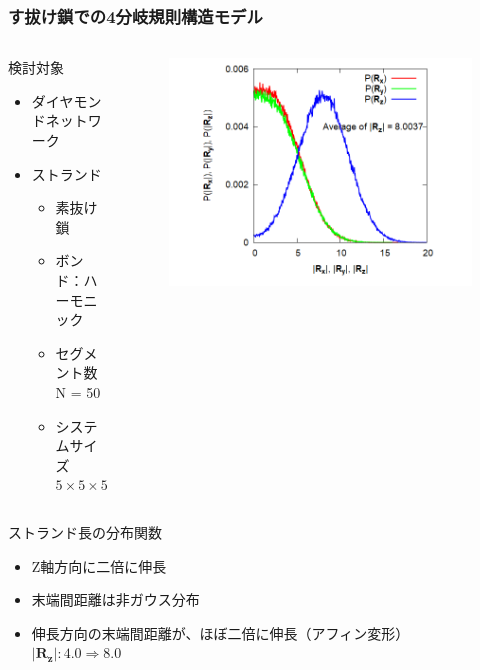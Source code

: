 \documentclass[11pt, dvipdfmx]{beamer}
\begin{document}
\begin{frame}
\frametitle{す拔け鎖での4分岐規則構造モデル}
\vspace{-3mm}
\begin{columns}[totalwidth=\linewidth]
\begin{block}{検討対象}
\begin{itemize}
\item
ダイヤモンドネットワーク
\item
ストランド
	\begin{itemize}
	\item 
	素抜け鎖
 	\item 
 	ボンド：ハーモニック
 	\item
 	セグメント数 N = 50
 	\item
	システムサイズ\\
	$5\times 5\times 5$
	\end{itemize}
\end{itemize}
\end{block}

\begin{figure}
\includegraphics[width=\columnwidth]{./fig/step_4_reg_Strand_histgram.png}
\end{figure}
\end{columns}

\vspace{-2mm}
\begin{exampleblock}{ストランド長の分布関数}
\begin{itemize}
\item
Z軸方向に二倍に伸長
\item
末端間距離は非ガウス分布
\item
伸長方向の末端間距離が、ほぼ二倍に伸長（アフィン変形）\\ $|\bm{R_z}| : 4.0 \Rightarrow 8.0$
\end{itemize}
\end{exampleblock}
\end{frame}
\end{document}

